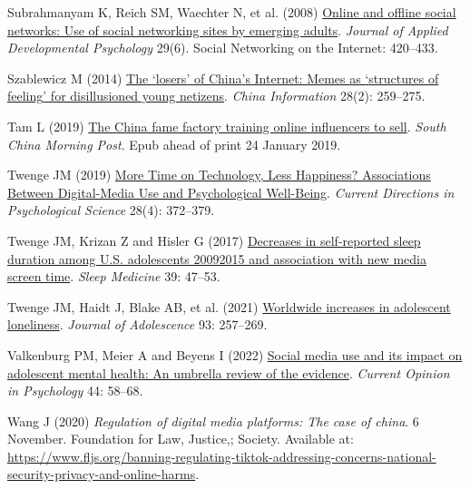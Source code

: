 \documentclass[
  letterpaper,
  DIV=11,
  numbers=noendperiod]{scrartcl}
\newlength{\cslhangindent}
\newlength{\cslentryspacingunit} %
\newenvironment{CSLReferences}[2] %
 {%
  \setlength{\parindent}{0pt}
  \ifodd #1
  \let\oldpar\par
  \def\par{\hangindent=\cslhangindent\oldpar}
  \fi
  \setlength{\parskip}{#2\cslentryspacingunit}
 }%
 {}
\begin{document}
\begin{CSLReferences}{1}{0}
\leavevmode{}%
Subrahmanyam K, Reich SM, Waechter N, et al. (2008)
\href{https://doi.org/10.1016/j.appdev.2008.07.003}{Online and offline
social networks: Use of social networking sites by emerging adults}.
\emph{Journal of Applied Developmental Psychology} 29(6). Social
Networking on the Internet: 420--433.

\leavevmode{}%
Szablewicz M (2014) \href{https://doi.org/10.1177/0920203X14531538}{The
{`}losers{'} of China{'}s Internet: Memes as {`}structures of feeling{'}
for disillusioned young netizens}. \emph{China Information} 28(2):
259--275.

\leavevmode{}%
Tam L (2019)
\href{https://www.scmp.com/lifestyle/entertainment/article/2183174/trust-me-you-need-how-chinas-live-streaming-kol-stars-are}{The
China fame factory training online influencers to sell}. \emph{South
China Morning Post}. Epub ahead of print 24 January 2019.

\leavevmode{}%
Twenge JM (2019) \href{https://doi.org/10.1177/0963721419838244}{More
Time on Technology, Less Happiness? Associations Between Digital-Media
Use and Psychological Well-Being}. \emph{Current Directions in
Psychological Science} 28(4): 372--379.

\leavevmode{}%
Twenge JM, Krizan Z and Hisler G (2017)
\href{https://doi.org/10.1016/j.sleep.2017.08.013}{Decreases in
self-reported sleep duration among U.S. adolescents
2009{\textendash}2015 and association with new media screen time}.
\emph{Sleep Medicine} 39: 47--53.

\leavevmode{}%
Twenge JM, Haidt J, Blake AB, et al. (2021)
\href{https://doi.org/10.1016/j.adolescence.2021.06.006}{Worldwide
increases in adolescent loneliness}. \emph{Journal of Adolescence} 93:
257--269.

\leavevmode{}%
Valkenburg PM, Meier A and Beyens I (2022)
\href{https://doi.org/10.1016/j.copsyc.2021.08.017}{Social media use and
its impact on adolescent mental health: An umbrella review of the
evidence}. \emph{Current Opinion in Psychology} 44: 58--68.

\leavevmode{}%
Wang J (2020) \emph{Regulation of digital media platforms: The case of
china}. 6 November. Foundation for Law, Justice,; Society. Available at:
\url{https://www.fljs.org/banning-regulating-tiktok-addressing-concerns-national-security-privacy-and-online-harms}.


\end{CSLReferences}
\end{document}

